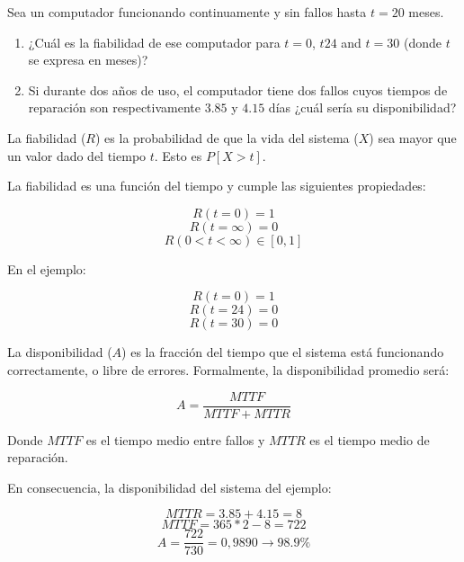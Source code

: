\begin{acexercise}\end{acexercise}

Sea un computador funcionando continuamente y sin fallos hasta $t=20$ meses.

\begin{enumerate}

\item ¿Cuál es la fiabilidad de ese computador para $t=0$, $t24$ and $t=30$ (donde $t$ se expresa en meses)?

\item Si durante dos años de uso, el computador tiene dos fallos cuyos tiempos de reparación son 
      respectivamente $3.85$ y $4.15$ días ¿cuál sería su disponibilidad?

\end{enumerate}

\begin{acsolution}\end{acsolution}

La fiabilidad ($R$) es la probabilidad de que la vida del sistema ($X$) 
sea mayor que un valor dado del tiempo $t$. Esto es $P[X>t]$.

La fiabilidad es una función del tiempo y cumple las siguientes propiedades:

\[ R(t=0)=1 \]
\[ R(t=\infty)=0 \]
\[ R(0<t<\infty) \in [0,1] \]

En el ejemplo:

\[R(t=0)=1\] 
\[R(t=24)=0\] 
\[R(t=30)=0\]

La disponibilidad ($A$) es la fracción del tiempo que el sistema está funcionando correctamente,
o libre de errores.
Formalmente, la disponibilidad promedio será:

\[
A=\frac{MTTF}{MTTF+MTTR}
\]

Donde $MTTF$ es el tiempo medio entre fallos y $MTTR$ es el tiempo medio de reparación.

En consecuencia, la disponibilidad del sistema del ejemplo:

\[ MTTR=3.85+4.15=8 \]
\[ MTTF=365*2-8=722 \]
\[ A=\frac{722}{730}= 0,9890 \rightarrow 98.9\% \]
